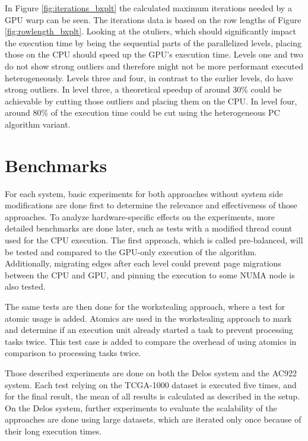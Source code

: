 In Figure \ref{fig:iterations_bxplt} the calculated maximum iterations needed by a GPU warp can be seen. The iterations data is based on the row lengths of Figure \ref{fig:rowlength_bxplt}. Looking at the otuliers, which should significantly impact the execution time by being the sequential parts of the parallelized levels, placing those on the CPU should speed up the GPU's execution time. Levels one and two do not show strong outliers and therefore might not be more performant executed heterogeneously. Levels three and four, in contrast to the earlier levels, do have strong outliers. In level three, a theoretical speedup of around 30\% could be achievable by cutting those outliers and placing them on the CPU. In level four, around 80\% of the execution time could be cut using the heterogeneous PC algorithm variant.

\section{Benchmarks}
\label{chap:benchmarks}
For each system, basic experiments for both approaches without system side modifications are done first to determine the relevance and effectiveness of those approaches. To analyze hardware-specific effects on the experiments, more detailed benchmarks are done later, such as tests with a modified thread count used for the CPU execution.
The first approach, which is called pre-balanced, will be tested and compared to the GPU-only execution of the algorithm. Additionally, migrating edges after each level could prevent page migrations between the CPU and GPU, and pinning the execution to some NUMA node is also  tested.

The same tests are then done for the workstealing approach, where a test for atomic usage is added. Atomics are used in the workstealing approach to mark and determine if an execution unit already started a task to prevent processing tasks twice. This test case is added to compare the overhead of using atomics in comparison to processing tasks twice.

Those described experiments are done on both the Delos system and the AC922 system. Each test relying on the TCGA-1000 dataset is executed five times, and for the final result, the mean of all results is calculated as described in the setup. On the Delos system, further experiments to evaluate the scalability of the approaches are done using large datasets, which are iterated only once because of their long execution times.

